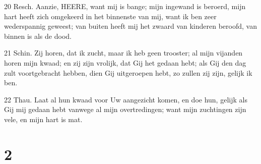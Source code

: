 \par 20 Resch. Aanzie, HEERE, want mij is bange; mijn ingewand is beroerd, mijn hart heeft zich omgekeerd in het binnenste van mij, want ik ben zeer wederspannig geweest; van buiten heeft mij het zwaard van kinderen beroofd, van binnen is als de dood.
\par 21 Schin. Zij horen, dat ik zucht, maar ik heb geen trooster; al mijn vijanden horen mijn kwaad; en zij zijn vrolijk, dat Gij het gedaan hebt; als Gij den dag zult voortgebracht hebben, dien Gij uitgeroepen hebt, zo zullen zij zijn, gelijk ik ben.
\par 22 Thau. Laat al hun kwaad voor Uw aangezicht komen, en doe hun, gelijk als Gij mij gedaan hebt vanwege al mijn overtredingen; want mijn zuchtingen zijn vele, en mijn hart is mat.

\chapter{2}

